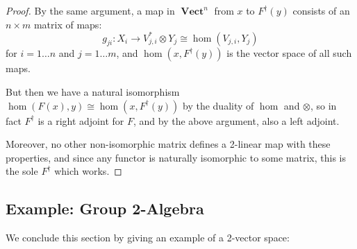 \documentclass[10pt]{amsart}
\numberwithin{theorem}{subsection}
\newcommand{\ra}{\mathop{\rightarrow}}
\newcommand{\opname}[1]{\operatorname{#1}}
\newcommand{\catname}[1]{\boldsymbol{\opname{{#1}}}}
\newcommand{\V}{\catname{Vect}}
\begin{document}
\begin{proof}
By the same argument, a map in $\V^n$ from $x$ to $F^{\dagger}(y)$ consists of an
$n \times m$ matrix of maps:
\begin{equation}
g_{ji}: X_i \ra V_{j,i}^{\ast} \otimes Y_j \cong \hom(V_{j,i},Y_j)
\end{equation}
for $i = 1 \dots n$ and $j = 1 \dots m$, and $\hom(x,F^{\dagger}(y))$ is the
vector space of all such maps.

But then we have a natural isomorphism $\hom(F(x),y) \cong \hom(x,F^{\dagger}(y))$
by the duality of $\hom$ and $\otimes$, so in fact $F^{\dagger}$ is a right
adjoint for $F$, and by the above argument, also a left adjoint.

Moreover, no other non-isomorphic matrix defines a 2-linear map with
these properties, and since any functor is naturally isomorphic to
some matrix, this is the sole $F^{\dagger}$ which works.
\end{proof}

\subsection{Example: Group 2-Algebra}

We conclude this section by giving an example of a 2-vector space:
\end{document}
